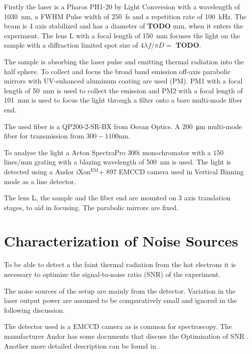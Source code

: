 \documentclass[
	parskip=half,
	a4paper,
]{scrarticle}
\begin{document}
Firstly the laser is a Pharos PH1-20 by Light Conversion with a wavelength of \SI{1030}{nm}, a FWHM Pulse width of \SI{250}{fs} and a repetition rate of \SI{100}{kHz}.
The beam is 4 axis stabilized and has a diameter of \textbf{TODO} \si{mm}, when it enters the experiment.
The lens \textsf{L} with a focal length of \SI{150}{mm} focuses the light on the sample with a diffraction limited spot size of $4 \lambda f / \pi D = $ \textbf{TODO}.

The sample is absorbing the laser pulse and emitting thermal radiation into the half sphere.
To collect and focus the broad band emission off-axis parabolic mirrors with  UV-enhanced aluminum coating are used (\textsf{PM}).
\textsf{PM1} with a focal length of \SI{50}{mm} is used to collect the emission and \textsf{PM2} with a focal length of \SI{101}{mm} is used to focus the light through a filter onto a bare multi-mode fiber end.

The used fiber is a QP200-2-SR-BX from Ocean Optics. A \SI{200}{\micro m} multi-mode fiber for transmission from $300-1100$\;\si{nm}.

To analyse the light a Acton SpectraPro 300i monochromator with a $150$\;lines/mm grating with a blazing wavelength of \SI{500}{nm} is used.
The light is detected using a Andor iXon$^\text{EM}$+ 897 EMCCD camera used in Vertical Binning mode as a line detector.

The lens \textsf{L}, the sample and the fiber end are mounted on 3 axis translation stages, to aid in focusing. The parabolic mirrors are fixed.

\section{Characterization of Noise Sources}
To be able to detect a the faint thermal radiation from the hot electrons it is necessary to optimize the signal-to-noise ratio (SNR) of the experiment.

The noise sources of the setup are mainly from the detector.
Variation in the laser output power are assumed to be comparatively small and ignored in the following discussion.

The detector used is a EMCCD camera as is common for spectroscopy. The manufacturer Andor has some documents that discuss the Optimisation of SNR \cite{andor_establishing_nodate,dr_jo_walters_sensitivity_2023}.
Another more detailed description can be found in \autocite{european_machine_vision_association_standard_2010}.
\end{document}
